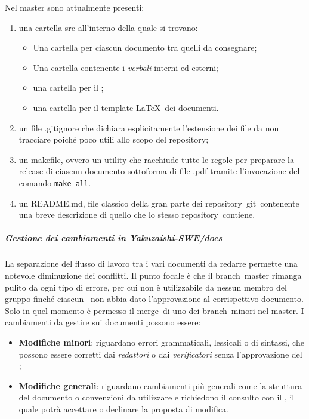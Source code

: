         Nel master sono attualmente presenti:
        \begin{enumerate}
            \item una cartella \textsf{src} all'interno della quale si trovano:
            \begin{itemize}
                \item Una cartella per ciascun documento tra quelli da consegnare;
                \item Una cartella contenente i \textit{verbali} interni ed esterni;
                \item una cartella per il \docNameGloLow;
                \item una cartella per il template \LaTeX\ dei documenti.
            \end{itemize}
            \item un file \textsf{.gitignore} che dichiara esplicitamente l’estensione dei file da non tracciare poiché poco utili allo scopo del repository\glo;
            \item un \textsf{makefile}, ovvero un utility che racchiude tutte le regole per preparare la release di ciascun documento sottoforma di file .pdf tramite l'invocazione del comando \texttt{make all}.
            \item un \textsf{README.md}, file classico della gran parte dei repository\glo\ git\glo\ contenente una breve descrizione di quello che lo stesso repository\glo\ contiene.
        \end{enumerate}
            \subparagraph{Gestione dei cambiamenti in Yakuzaishi-SWE/docs}
            La separazione del flusso di lavoro tra i vari documenti da redarre permette una notevole diminuzione dei conflitti. Il punto focale è che il branch\glo\ master rimanga pulito da ogni tipo di errore, per cui non è utilizzabile da nessun membro del gruppo finché ciascun \roleProjectManagerLow\ non abbia dato l’approvazione al corrispettivo documento. Solo in quel momento è permesso il merge\glo\ di uno dei branch\glo\ minori nel master. I cambiamenti da gestire sui documenti possono essere:
            \begin{itemize}
                \item \textbf{Modifiche minori}: riguardano errori grammaticali, lessicali o di sintassi, che possono essere corretti dai \textit{redattori} o dai \textit{verificatori} senza l’approvazione del \roleProjectManagerLow;
                \item \textbf{Modifiche generali}: riguardano cambiamenti più generali come la struttura del documento o convenzioni da utilizzare e richiedono il consulto con il \roleProjectManagerLow, il quale potrà accettare o declinare la proposta di modifica.
            \end{itemize}

